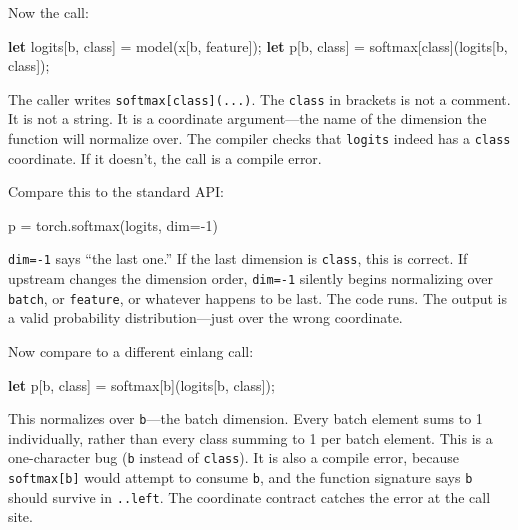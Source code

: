 \documentclass[11pt,]{article}
\newenvironment{Shaded}{}{}
\newcommand{\DecValTok}[1]{\textcolor[rgb]{0.25,0.63,0.44}{#1}}
\newcommand{\KeywordTok}[1]{\textcolor[rgb]{0.00,0.44,0.13}{\textbf{#1}}}
\newcommand{\NormalTok}[1]{#1}
\newcommand{\OperatorTok}[1]{\textcolor[rgb]{0.40,0.40,0.40}{#1}}
\begin{document}
Now the call:

\begin{Shaded}
\begin{Highlighting}[]
\KeywordTok{let}\NormalTok{ logits}\OperatorTok{[}\NormalTok{b, class}\OperatorTok{]}\NormalTok{ = model(x}\OperatorTok{[}\NormalTok{b, feature}\OperatorTok{]}\NormalTok{);}
\KeywordTok{let}\NormalTok{ p}\OperatorTok{[}\NormalTok{b, class}\OperatorTok{]}\NormalTok{ = softmax}\OperatorTok{[}\NormalTok{class}\OperatorTok{]}\NormalTok{(logits}\OperatorTok{[}\NormalTok{b, class}\OperatorTok{]}\NormalTok{);}
\end{Highlighting}
\end{Shaded}

The caller writes \texttt{softmax{[}class{]}(...)}. The \texttt{class}
in brackets is not a comment. It is not a string. It is a coordinate
argument---the name of the dimension the function will normalize over.
The compiler checks that \texttt{logits} indeed has a \texttt{class}
coordinate. If it doesn't, the call is a compile error.

Compare this to the standard API:

\begin{Shaded}
\begin{Highlighting}[]
\NormalTok{p }\OperatorTok{=}\NormalTok{ torch.softmax(logits, dim}\OperatorTok{=-}\DecValTok{1}\NormalTok{)}
\end{Highlighting}
\end{Shaded}

\texttt{dim=-1} says ``the last one.'' If the last dimension is
\texttt{class}, this is correct. If upstream changes the dimension
order, \texttt{dim=-1} silently begins normalizing over \texttt{batch},
or \texttt{feature}, or whatever happens to be last. The code runs. The
output is a valid probability distribution---just over the wrong
coordinate.

Now compare to a different einlang call:

\begin{Shaded}
\begin{Highlighting}[]
\KeywordTok{let}\NormalTok{ p}\OperatorTok{[}\NormalTok{b, class}\OperatorTok{]}\NormalTok{ = softmax}\OperatorTok{[}\NormalTok{b}\OperatorTok{]}\NormalTok{(logits}\OperatorTok{[}\NormalTok{b, class}\OperatorTok{]}\NormalTok{);}
\end{Highlighting}
\end{Shaded}

This normalizes over \texttt{b}---the batch dimension. Every batch
element sums to 1 individually, rather than every class summing to 1 per
batch element. This is a one-character bug (\texttt{b} instead of
\texttt{class}). It is also a compile error, because
\texttt{softmax{[}b{]}} would attempt to consume \texttt{b}, and the
function signature says \texttt{b} should survive in \texttt{..left}.
The coordinate contract catches the error at the call site.
\end{document}
